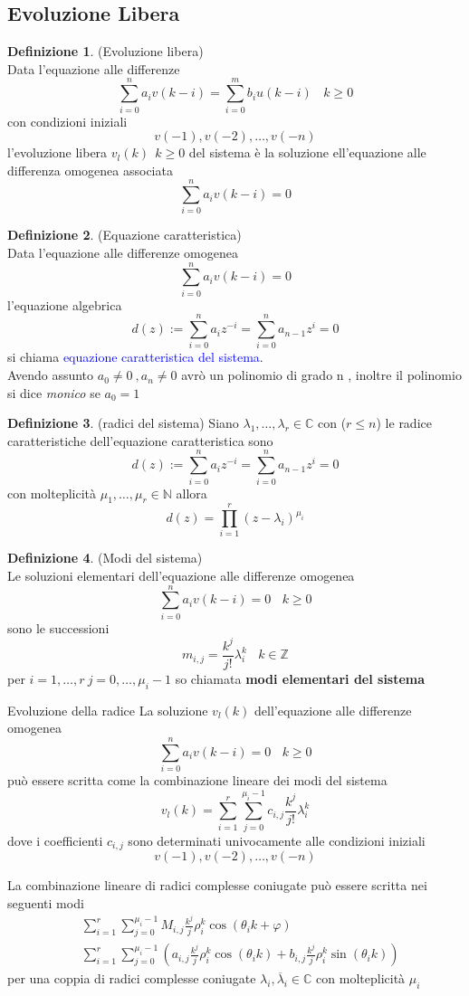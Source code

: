 \documentclass{article}
\theoremstyle{definition}
\newtheorem*{definizione}{Definizione}
\newcommand{\C}{\mathbb{C}}
\newcommand{\la}{\lambda}
\newcommand{\sisdiscro}{\sum_{i=0}^n a_iv(k-i)=\sum_{i=0}^m b_iu(k-i) \ \ \ \ k \geq 0}
\begin{document}
	\subsection{Evoluzione Libera}
	\begin{definizione}(Evoluzione libera) \\
		Data l'equazione alle differenze $$\sisdiscro$$ con condizioni iniziali $$v(-1),v(-2), \dots , v(-n)$$
l'evoluzione libera $v_l(k) \ \ k \geq 0$ del sistema è la soluzione ell'equazione alle differenza omogenea associata
$$\sum_{i=0}^{n}a_i v(k-i)=0$$
	\end{definizione}
	\begin{definizione}(Equazione caratteristica)\\
		Data l'equazione alle differenze omogenea
		$$\sum_{i=0}^{n}a_i v(k-i)=0$$
		l'equazione algebrica 
		$$d(z):=\sum_{i=0}^{n}a_iz^{-i}=\sum_{i=0}^{n}a_{n-1} z^i=0$$
		si chiama \textcolor{blue}{equazione caratteristica del sistema}. \\
		Avendo assunto $a_0\neq 0 \ , a_n \neq 0$ avrò un polinomio di grado n , inoltre il polinomio si dice \textit{monico} se $a_0=1$  
	\end{definizione}
	\begin{definizione}(radici del sistema)
		Siano $\la_1 , \dots , \la _r \in \C$ con ($r \leq n$) le radice caratteristiche dell'equazione caratteristica sono 
		$$d(z):=\sum_{i=0}^{n}a_iz^{-i}=\sum_{i=0}^{n}a_{n-1} z^i=0$$
		con molteplicità $\mu_1 , \dots , \mu_r \in \mathbb{N}$ allora 
		$$d(z)=\prod_{i=1}^r (z-\la_i)^{\mu_i}$$
	\end{definizione}
	\begin{definizione}(Modi del sistema)\\
		Le soluzioni elementari dell'equazione alle differenze omogenea
$$\sum_{i=0}^{n}a_i v(k-i)=0 \ \  \ \ k \geq 0$$
sono le successioni 
$$m_{i,j}=\frac{k^j}{j!}\la_i^k \ \ \ \ k \in \mathbb{Z}$$
per $i=1, \dots , r \ j=0,\dots , \mu_i-1$ so chiamata \textbf{modi elementari del sistema}
	\end{definizione}
	\begin{teo}{Evoluzione della radice}{}
		La soluzione $v_l(k)$ dell'equazione alle differenze omogenea 
		$$\sum_{i=0}^{n}a_i v(k-i)=0 \ \  \ \ k \geq 0$$ 
		può essere scritta come la combinazione lineare dei modi del sistema 
		$$v_l(k)=\sum_{i=1}^{r}\sum_{j=0}^{\mu_i-1}c_{i,j}\frac{k^j}{j!}\la_i^k$$
		dove i coefficienti $c_{i,j}$ sono determinati univocamente alle condizioni iniziali 
		$$v(-1),v(-2), \dots , v(-n)$$
	\end{teo}
	La combinazione lineare di radici complesse coniugate può essere scritta nei seguenti modi 
	\begin{align*}
		&\sum_{i=1}^{r}\sum_{j=0}^{\mu_i-1}M_{i,j} \frac{k^j}{j}\rho_i^k \cos (\theta_ik+\varphi) \\
		&\sum_{i=1}^{r}\sum_{j=0}^{\mu_i-1} \left(a_{i,j} \frac{k^j}{j}\rho_i^k \cos(\theta_i k) + b_{i,j}\frac{k^j}{j} \rho_i^k \sin(\theta_ik)\right) 
	\end{align*}
	per una coppia di radici complesse coniugate $\la_i,\overline{\la}_i \in \C $ con molteplicità $\mu_i$
 
\end{document}
